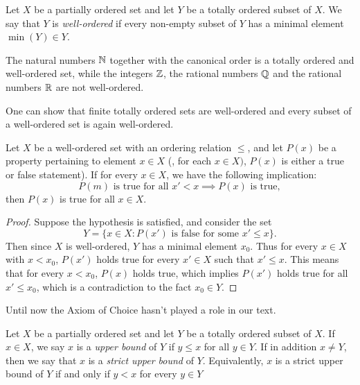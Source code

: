 \begin{defn}
Let $X$ be a partially ordered set and let $Y$ be a totally ordered subset 
of $X$. 
We say that $Y$ is \emph{well-ordered} if every non-empty subset of $Y$ has 
a minimal element $\min(Y) \in Y$. 
\end{defn}

\begin{example}
The natural numbers $\mathbb{N}$ together with the canonical order is a totally 
ordered and well-ordered set, while the integers $\mathbb{Z}$, the rational numbers 
$\mathbb{Q}$ and the rational numbers $\mathbb{R}$ are not well-ordered. 
\end{example}

One can show that finite totally ordered sets are well-ordered and every 
subset of a well-ordered set is again well-ordered. 

\begin{thm}
Let $X$ be a well-ordered set with an ordering relation $\le$, and let 
$P(x)$ be a property pertaining to element $x \in X$ (\ie, for each $x \in 
X)$, $P(x)$ is either a true or false statement). 
If for every $x \in X$, we have the following implication: 
\begin{equation*}
    P(m) \text{ is true for all } x' < x \implies P(x) \text{ is true}, 
\end{equation*}
then $P(x)$ is true for all $x \in X$. 
\end{thm}
\begin{proof}
Suppose the hypothesis is satisfied, and consider the set 
\begin{equation*}
    Y = \{x \in X: P(x') \text{ is false for some } x' \le x\}.
\end{equation*}
Then since $X$ is well-ordered, $Y$ has a minimal element $x_0$. 
Thus for every $x \in X$ with $x < x_0$, $P(x')$ holds true for every 
$x' \in X$ such that $x' \le x$. 
This means that for every $x < x_0$, $P(x)$ holds true, which implies 
$P(x')$ holds true for all $x' \le x_0$, which is a contradiction to the 
fact $x_0 \in Y$. 
\end{proof}

Until now the Axiom of Choice hasn't played a role in our text. 
\begin{defn}
Let $X$ be a partially ordered set and let $Y$ be a totally ordered subset 
of $X$. 
If $x \in X$, we say $x$ is a \emph{upper bound} of $Y$ if $y \le x$ for all 
$y \in Y$. 
If in addition $x \neq Y$, then we say that $x$ is a \emph{strict upper 
bound} of $Y$. 
Equivalently, $x$ is a strict upper bound of $Y$ if and only if $y < x$ 
for every $y \in Y$
\end{defn}

